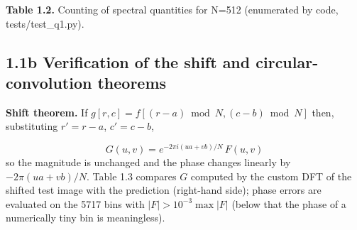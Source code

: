 \documentclass[10pt,a4paper]{article}
\begin{document}
\begin{table}[H]\centering\small{\small\textbf{Table 1.2.} Counting of spectral quantities for N=512 (enumerated by code, tests/test\_q1.py).\par}\vskip 3pt
\end{table}
\subsection{1.1b Verification of the shift and circular-convolution theorems}
\textbf{Shift theorem.} If $g[r,c]=f[(r-a)\bmod N,(c-b)\bmod N]$ then, substituting $r'=r-a$, $c'=c-b$,

\begin{equation}G(u,v)=e^{-2\pi i (ua+vb)/N}\,F(u,v)\end{equation}
so the magnitude is unchanged and the phase changes linearly by $-2\pi(ua+vb)/N$. Table 1.3 compares $G$ computed by the custom DFT of the shifted test image with the prediction (right-hand side); phase errors are evaluated on the 5717 bins with $|F|>10^{-3}\max|F|$ (below that the phase of a numerically tiny bin is meaningless).
\end{document}
